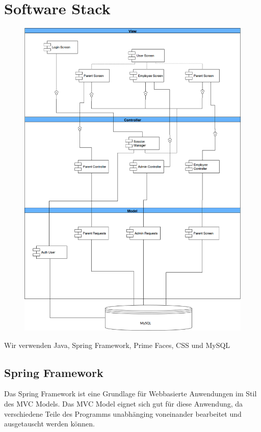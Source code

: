 \newpage
\section{Software Stack}

\begin{figure}[ht!]
\includegraphics[width=1.08\textwidth]{component/Komponentendiagramm.png}
\end{figure}
\newpage
Wir verwenden Java, Spring Framework, Prime Faces, CSS und MySQL

\subsection{Spring Framework}
Das Spring Framework ist eine Grundlage für Webbasierte Anwendungen im Stil des MVC Models. Das MVC Model eignet sich gut für diese Anwendung, da verschiedene Teile des Programms unabhänging voneinander bearbeitet und ausgetauscht werden können.

